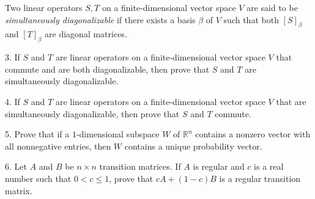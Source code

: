 \documentclass[12pt]{article} %
\newcommand{\R}{\mathbb{R}}
\renewcommand\le{\leqslant}
\begin{document}
\begin{flushleft}
Two linear operators $S,T$ on a finite-dimensional vector space $V$ are said to be \textit{simultaneously diagonalizable} if there exists a basis $\beta$ of $V$ such that both $[S]_\beta$ and $[T]_\beta$ are diagonal matrices.\\                                    
\vspace{.3cm}


3.  If $S$ and $T$ are linear operators on a finite-dimensional vector space $V$ that commute and are both diagonalizable, then prove that $S$ and $T$ are simultaneously diagonalizable.\\

\vspace{.5cm}



4.  If $S$ and $T$ are linear operators on a finite-dimensional vector space $V$ that are simultaneously diagonalizable, then prove that $S$ and $T$ commute.


\vspace{.8cm}

5.  Prove that if a $1$-dimensional subspace $W$ of $\R^n$ contains a nonzero vector with all nonnegative entries, then $W$ contains a unique probability vector.


\vspace{.5cm}

6.  Let $A$ and $B$ be $n \times n$ transition matrices.  If $A$ is regular and $c$ is a real number such that $0 < c \le 1$, prove that $cA + (1-c)B$ is a regular transition matrix.\\


 



 
\end{flushleft}
\end{document}
